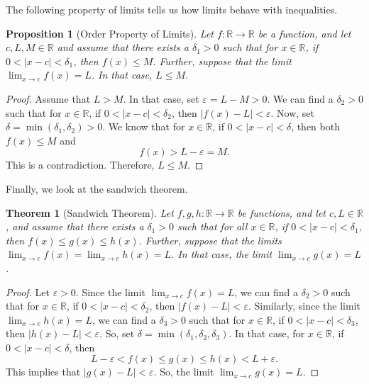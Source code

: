 \documentclass[a4paper, openany]{memoir}
\theoremstyle{definition}
\theoremstyle{plain}
\newtheorem{theorem}[definition]{Theorem}
\newtheorem{proposition}[definition]{Proposition}
\begin{document}
The following property of limits tells us how limits behave with inequalities.
\begin{proposition}[Order Property of Limits]
Let $f: \mathbb{R} \to \mathbb{R}$ be a function, and let $c, L, M \in \mathbb{R}$ and assume that there exists a $\delta_1 > 0$ such that for $x \in \mathbb{R}$, if $0 < |x - c| < \delta_1$, then $f(x) \leqslant M$. Further, suppose that the limit $\lim_{x \to c} f(x) = L$. In that case, $L \leqslant M$.
\end{proposition}
\begin{proof}
Assume that $L > M$. In that case, set $\varepsilon = L - M > 0$. We can find a $\delta_2 > 0$ such that for $x \in \mathbb{R}$, if $0 < |x - c| < \delta_2$, then $|f(x) - L| < \varepsilon$. Now, set $\delta = \min(\delta_1, \delta_2) > 0$. We know that for $x \in \mathbb{R}$, if $0 < |x - c| < \delta$, then both $f(x) \leqslant M$ and
\[f(x) > L - \varepsilon = M.\]
This is a contradiction. Therefore, $L \leqslant M$.
\end{proof}
\noindent Finally, we look at the sandwich theorem.
\begin{theorem}[Sandwich Theorem]
Let $f, g, h: \mathbb{R} \to \mathbb{R}$ be functions, and let $c, L \in \mathbb{R}$, and assume that there exists a $\delta_1 > 0$ such that for all $x \in \mathbb{R}$, if $0 < |x - c| < \delta_1$, then $f(x) \leqslant g(x) \leqslant h(x)$. Further, suppose that the limits $\lim_{x \to c} f(x) = \lim_{x \to c} h(x) = L$. In that case, the limit $\lim_{x \to c} g(x) = L$.
\end{theorem}
\begin{proof}
Let $\varepsilon > 0$. Since the limit $\lim_{x \to c} f(x) = L$, we can find a $\delta_2 > 0$ such that for $x \in \mathbb{R}$, if $0 < |x - c| < \delta_2$, then $|f(x) - L| < \varepsilon$. Similarly, since the limit $\lim_{x \to c} h(x) = L$, we can find a $\delta_3 > 0$ such that for $x \in \mathbb{R}$, if $0 < |x - c| < \delta_3$, then $|h(x) - L| < \varepsilon$. So, set $\delta = \min(\delta_1, \delta_2, \delta_3)$. In that case, for $x \in \mathbb{R}$, if $0 < |x - c| < \delta$, then
\[L - \varepsilon < f(x) \leqslant g(x) \leqslant h(x) < L + \varepsilon.\]
This implies that $|g(x) - L| < \varepsilon$. So, the limit $\lim_{x \to c} g(x) = L$.
\end{proof}
\end{document}
